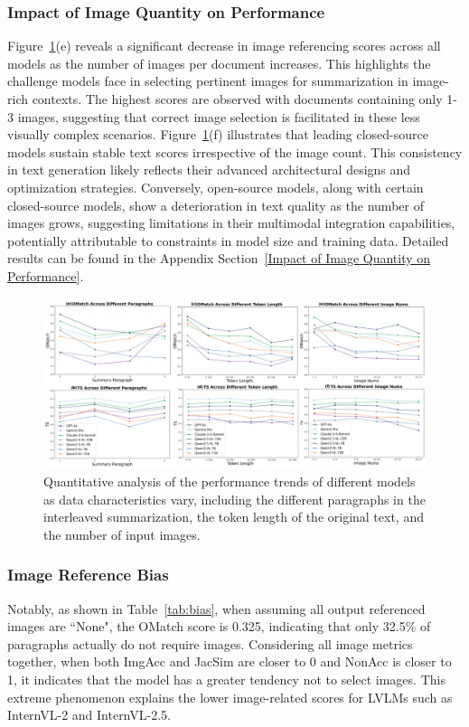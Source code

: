 \subsubsection{Impact of Image Quantity on Performance}
Figure~\ref{fig:analysis}(e) reveals a significant decrease in image referencing scores across all models as the number of images per document increases. This highlights the challenge models face in selecting pertinent images for summarization in image-rich contexts. The highest scores are observed with documents containing only 1-3 images, suggesting that correct image selection is facilitated in these less visually complex scenarios.
Figure~\ref{fig:analysis}(f) illustrates that leading closed-source models sustain stable text scores irrespective of the image count. This consistency in text generation likely reflects their advanced architectural designs and optimization strategies. Conversely, open-source models, along with certain closed-source models, show a deterioration in text quality as the number of images grows, suggesting limitations in their multimodal integration capabilities, potentially attributable to constraints in model size and training data.
Detailed results can be found in the Appendix Section~\ref{Impact of Image Quantity on Performance}.


\begin{figure}[t]
\centering
\includegraphics[width=1.0\textwidth]{figs/fig_analysis}
\caption{Quantitative analysis of the performance trends of different models as data characteristics vary, including the different paragraphs in the interleaved summarization, the token length of the original text, and the number of input images.}
\label{fig:analysis}
\end{figure}


\subsubsection{Image Reference Bias}

Notably, as shown in Table~\ref{tab:bias}, when assuming all output referenced images are ``None", the OMatch score is 0.325, indicating that only 32.5\% of paragraphs actually do not require images. Considering all image metrics together, when both ImgAcc and JacSim are closer to 0 and NonAcc is closer to 1, it indicates that the model has a greater tendency not to select images. This extreme phenomenon explains the lower image-related scores for LVLMs such as InternVL-2 and InternVL-2.5.

